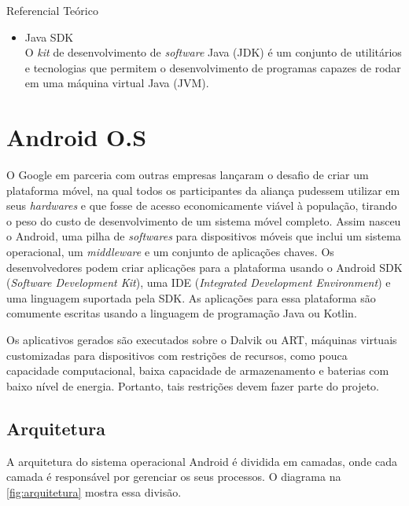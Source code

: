 \documentclass[
	12pt,				%
	openany,			%
	twoside,			%
	a4paper,			%
	english,			%
	french,				%
	spanish,			%
	brazil				%
	]{abntex2}
\begin{document}
\begin{chapter}{Referencial Teórico}
\begin{itemize}
     \item{Java SDK} \\
O \textit{kit} de desenvolvimento de \textit{software} Java (JDK) é um conjunto de utilitários e tecnologias que permitem o desenvolvimento de programas capazes de rodar em uma máquina virtual Java (JVM).
\end{itemize}


\section{Android O.S}
O Google em parceria com outras empresas lançaram o desafio de criar um plataforma móvel, na qual todos os participantes da aliança pudessem utilizar em seus \textit{hardwares} e que fosse de acesso economicamente viável à população, tirando o peso do custo de desenvolvimento de um sistema móvel completo. Assim nasceu o Android, uma pilha de \textit{softwares} para dispositivos móveis que inclui um sistema operacional, um \textit{middleware} e um conjunto de aplicações chaves. Os desenvolvedores podem criar aplicações para a plataforma usando o Android SDK (\textit{Software Development Kit}), uma IDE (\textit{Integrated Development Environment}) e uma linguagem suportada pela SDK. As aplicações para essa plataforma são comumente escritas usando a linguagem de programação Java ou Kotlin. \cite{rbhag}

Os aplicativos gerados são executados sobre o Dalvik ou ART,  máquinas virtuais customizadas para dispositivos com restrições de recursos, como pouca capacidade computacional, baixa capacidade de armazenamento e baterias com baixo nível de energia. Portanto, tais restrições devem fazer parte do projeto.

\newpage
\subsection{Arquitetura}
A arquitetura do sistema operacional Android é dividida em camadas, onde cada camada é responsável por gerenciar os seus processos. O diagrama na \autoref{fig:arquitetura} mostra essa divisão.


\end{chapter}
\end{document}

